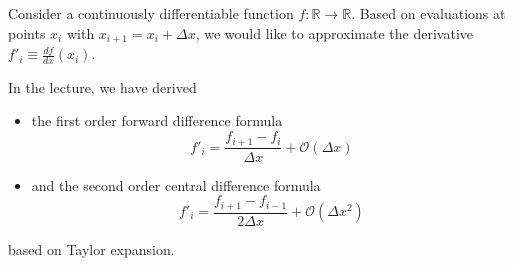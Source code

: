     Consider a continuously differentiable function $f: \mathbb{R} \to \mathbb{R}$.
    Based on evaluations at points $x_i$ with $x_{i+1} = x_{i} + \Delta x$, we 
    would like to approximate the derivative $f'_i \equiv \frac{df}{dx}(x_i)$.

    In the lecture, we have derived

    \begin{itemize}
        \item the first order forward difference formula
        \begin{equation}
                f'_i = \frac{f_{i+1} - f_{i}}{\Delta x} + \mathcal{O}(\Delta x)
        \end{equation}
        \item and the second order central difference formula
        \begin{equation}
            f'_i = \frac{f_{i+1} - f_{i-1}}{2 \Delta x} + \mathcal{O}(\Delta x^2)
        \end{equation}
    \end{itemize}

    based on Taylor expansion.

